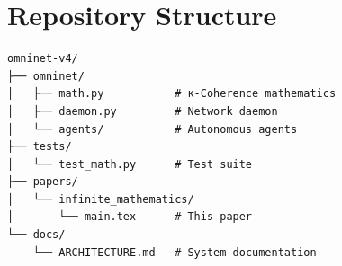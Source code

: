 \documentclass[11pt,a4paper]{article}
\begin{document}
\section{Repository Structure}

\begin{verbatim}
omninet-v4/
├── omninet/
│   ├── math.py           # κ-Coherence mathematics
│   ├── daemon.py         # Network daemon
│   └── agents/           # Autonomous agents
├── tests/
│   └── test_math.py      # Test suite
├── papers/
│   └── infinite_mathematics/
│       └── main.tex      # This paper
└── docs/
    └── ARCHITECTURE.md   # System documentation
\end{verbatim}
\end{document}
